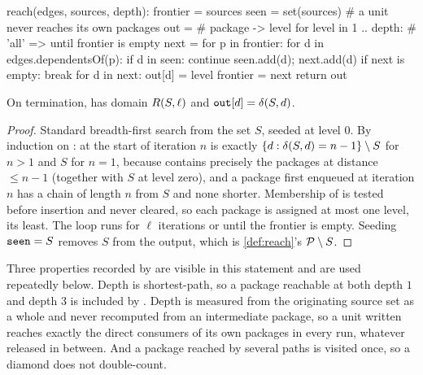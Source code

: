 \begin{speccode}
reach(edges, sources, depth):
    frontier = sources
    seen     = set(sources)                     # a unit never reaches its own packages
    out      = {}                               # package -> level
    for level in 1 .. depth:                    # 'all' => until frontier is empty
        next = {}
        for p in frontier:
            for d in edges.dependentsOf(p):
                if d in seen: continue
                seen.add(d); next.add(d)
        if next is empty: break
        for d in next: out[d] = level
        frontier = next
    return out
\end{speccode}

\begin{lemma}
\label{lem:reach}
On termination,  has domain $R(S,\ell)$ and
$\texttt{out}[d] = \delta(S,d)$.
\end{lemma}

\begin{proof}
Standard breadth-first search from the set $S$, seeded at level $0$. By
induction on :  at the start of iteration $n$ is
exactly $\{d : \delta(S,d) = n-1\} \setminus S$ for $n>1$ and $S$ for $n=1$,
because  contains precisely the packages at distance $\leq n-1$
(together with $S$ at level zero), and a package first enqueued at iteration $n$ has a chain of
length $n$ from $S$ and none shorter. Membership of  is tested
before insertion and never cleared, so each package is assigned at most one
level, its least. The loop runs for $\ell$ iterations or until the frontier is
empty. Seeding $\texttt{seen} = S$ removes $S$ from the output, which is
\cref{def:reach}'s $\mathcal{P} \setminus S$.
\end{proof}

Three properties recorded by  are visible in this statement and are
used repeatedly below. Depth is shortest-path, so a package reachable at both
depth $1$ and depth $3$ is included by . Depth is measured from the
originating source set as a whole and never recomputed from an intermediate
package, so a unit written  reaches exactly the direct consumers of its
own packages in every run, whatever released in between. And a package reached
by several paths is visited once, so a diamond does not double-count.

